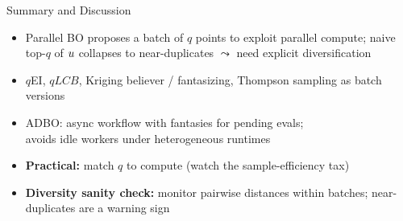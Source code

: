 \documentclass[main]{subfiles}
\begin{document}
\begin{frame}[t]{Summary and Discussion}
  \begin{itemize}
    \item Parallel BO proposes a batch of $q$ points to exploit parallel compute; naive top-$q$ of $u$ collapses to near-duplicates $\leadsto$ need explicit diversification
    \item $q$EI, $qLCB$, Kriging believer / fantasizing, Thompson sampling as batch versions
    \item ADBO: async workflow with fantasies for pending evals;\\
    avoids idle workers under heterogeneous runtimes
    \item \textbf{Practical:} match $q$ to compute (watch the sample-efficiency tax)
    \item \textbf{Diversity sanity check:} monitor pairwise distances within batches; near-duplicates are a warning sign
  \end{itemize}
\end{frame}
\end{document}
